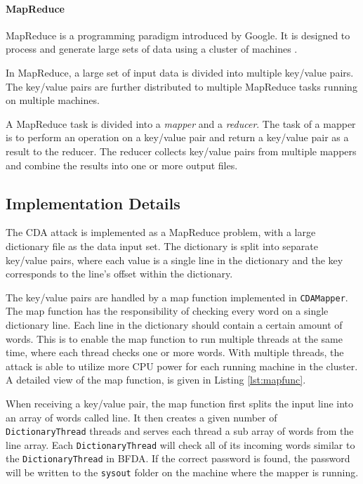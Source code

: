 \documentclass[pdftex,english,10pt,b5paper,twoside]{book}
\begin{document}
\paragraph{MapReduce} MapReduce is a programming paradigm introduced by Google.
It is designed to process and generate large sets of data using a cluster of
machines \cite{mapred}.

In MapReduce, a large set of input data is divided into multiple key/value
pairs. The key/value pairs are further distributed to multiple MapReduce tasks
running on multiple machines.

A MapReduce task is divided into a \emph{mapper} and a \emph{reducer}. The task
of a mapper is to perform an operation on a key/value pair and return a
key/value pair as a result to the reducer. The reducer collects key/value pairs
from multiple mappers and combine the results into one or more output files.

\subsection{Implementation Details}

The \ac{CDA} attack is implemented as a MapReduce problem, with a large
dictionary file as the data input set. The dictionary is split into separate
key/value pairs, where each value is a single line in the dictionary and the
key corresponds to the line's offset within the dictionary.

The key/value pairs are handled by a map function implemented in
\texttt{CDAMapper}. The
map function has the responsibility of checking every word on a single
dictionary line. Each line in the dictionary should contain a certain amount of
words. This is to enable the map function to run multiple threads at the same
time, where each thread checks one or more words. With multiple threads, the
attack is able to utilize more \ac{CPU} power for each running machine in the
cluster. A detailed view of the map function, is given in Listing
\ref{lst:mapfunc}.



When receiving a key/value pair, the map function first splits the input line
into an array of words called line. It then creates a given number of
\texttt{DictionaryThread} threads and serves each thread a sub array of words from the
line array. Each \texttt{DictionaryThread} will check all of its incoming words similar
to the \texttt{DictionaryThread} in BFDA. If the correct password is found, the
password will be written to the \texttt{sysout} folder on the machine where the mapper is
running.
\end{document}
